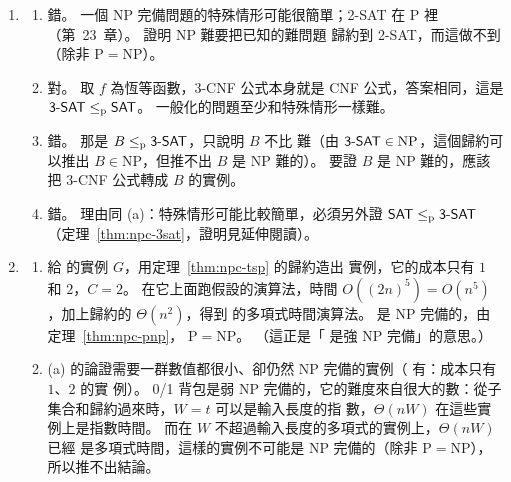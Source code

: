 \begin{enumerate}
\item
\begin{enumerate}
\item 錯。 一個 NP 完備問題的特殊情形可能很簡單；2-SAT 在 P 裡（第~23~章）。 證明 NP 難要把已知的難問題
歸約到 2-SAT，而這做不到（除非 $\mathrm{P} = \mathrm{NP}$）。
\item 對。 取 $f$ 為恆等函數，3-CNF 公式本身就是 CNF 公式，答案相同，這是 $\textsf{3-SAT} \le_{\mathrm{p}}
\textsf{SAT}$。 一般化的問題至少和特殊情形一樣難。
\item 錯。 那是 $B \le_{\mathrm{p}} \textsf{3-SAT}$，只說明 $B$ 不比  難（由 $\textsf{3-SAT} \in
\mathrm{NP}$，這個歸約可以推出 $B \in \mathrm{NP}$，但推不出 $B$ 是 NP 難的）。 要證 $B$ 是 NP 難的，應該把 3-CNF 公式轉成 $B$ 的實例。
\item 錯。 理由同 (a)：特殊情形可能比較簡單，必須另外證 $\textsf{SAT} \le_{\mathrm{p}} \textsf{3-SAT}$
（定理~\ref{thm:npc-3sat}，證明見延伸閱讀）。
\end{enumerate}

\item
\begin{enumerate}
\item 給  的實例 $G$，用定理~\ref{thm:npc-tsp} 的歸約造出  實例，它的成本只有 $1$
和 $2$，$C = 2$。 在它上面跑假設的演算法，時間 $O((2n)^5) = O(n^5)$，加上歸約的 $\Theta(n^2)$，得到
 的多項式時間演算法。  是 NP 完備的，由定理~\ref{thm:npc-pnp}，
$\mathrm{P} = \mathrm{NP}$。 （這正是「 是強 NP 完備」的意思。）
\item (a) 的論證需要一群數值都很小、卻仍然 NP 完備的實例（ 有：成本只有 $1$、$2$ 的實
例）。 0/1 背包是弱 NP 完備的，它的難度來自很大的數：從子集合和歸約過來時，$W = t$ 可以是輸入長度的指
數，$\Theta(nW)$ 在這些實例上是指數時間。 而在 $W$ 不超過輸入長度的多項式的實例上，$\Theta(nW)$ 已經
是多項式時間，這樣的實例不可能是 NP 完備的（除非 $\mathrm{P} = \mathrm{NP}$），所以推不出結論。
\end{enumerate}


\end{enumerate}
